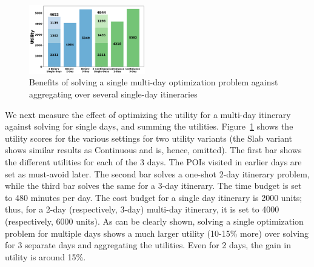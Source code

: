 \begin{figure}[t]
\centering
\includegraphics[width=0.45\textwidth]{plots/multivssingle.png}
\caption{Benefits of solving a single multi-day optimization problem against aggregating over several single-day itineraries}
\label{fig:multi-day}
\end{figure}

We next measure the effect of optimizing the utility for a multi-day itinerary against solving for single days, and summing the utilities.
Figure~\ref{fig:multi-day} shows the utility scores for the various settings for two utility variants (the Slab variant shows similar results as Continuous and is, hence, omitted).
The first bar shows the different utilities for each of the 3 days. The POIs visited in earlier days are set as must-avoid later.
The second bar solves a one-shot 2-day itinerary problem, while the third bar solves the same for a 3-day itinerary.
The time budget is set to 480 minutes per day.
The cost budget for a single day itinerary is 2000 units; thus, for a 2-day (respectively, 3-day) multi-day itinerary, it is set to 4000 (respectively, 6000 units).
As can be clearly shown, solving a single optimization problem for multiple days shows a much larger utility (10-15\% more) over solving for 3 separate days and aggregating the utilities.
Even for 2 days, the gain in utility is around 15\%.

